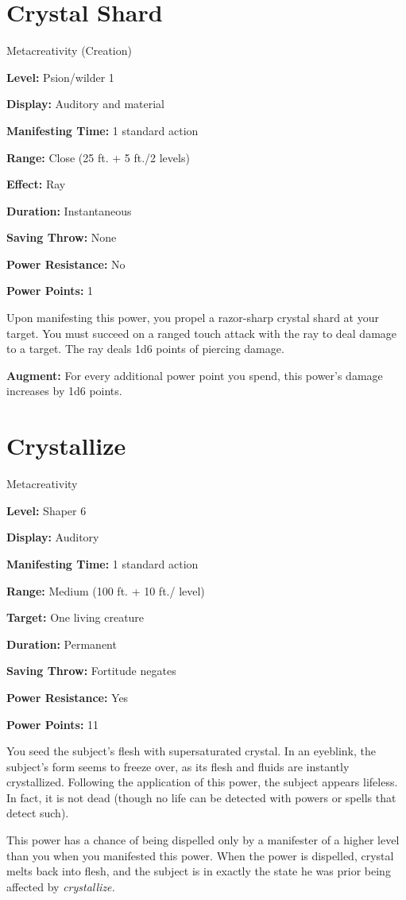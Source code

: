 \documentclass{article}
\begin{document}
\vspace{12pt}
\section*{Crystal Shard}

Metacreativity (Creation)

\textbf{Level:} Psion/wilder 1

\textbf{Display:} Auditory and material

\textbf{Manifesting Time:} 1 standard action

\textbf{Range:} Close (25 ft. + 5 ft./2 levels)

\textbf{Effect:} Ray

\textbf{Duration:} Instantaneous

\textbf{Saving Throw:} None

\textbf{Power Resistance:} No

\textbf{Power Points:} 1

Upon manifesting this power, you propel a razor-sharp crystal shard at your target. 
You must succeed on a ranged touch attack with the ray to deal damage to a target. 
The ray deals 1d6 points of piercing damage.

\textbf{Augment:} For every additional power point you spend, this power's damage 
increases by 1d6 points.

\vspace{12pt}
\section*{Crystallize}

Metacreativity

\textbf{Level:} Shaper 6

\textbf{Display:} Auditory

\textbf{Manifesting Time:} 1 standard action

\textbf{Range:} Medium (100 ft. + 10 ft./ level)

\textbf{Target:} One living creature

\textbf{Duration:} Permanent

\textbf{Saving Throw:} Fortitude negates

\textbf{Power Resistance:} Yes

\textbf{Power Points:} 11

You seed the subject's flesh with supersaturated crystal. In an eyeblink, the subject's 
form seems to freeze over, as its flesh and fluids are instantly crystallized. 
Following the application of this power, the subject appears lifeless. In fact, 
it is not dead (though no life can be detected with powers or spells that detect 
such).

This power has a chance of being dispelled only by a manifester of a higher level 
than you when you manifested this power. When the power is dispelled, crystal melts 
back into flesh, and the subject is in exactly the state he was prior being affected 
by \textit{crystallize.}

\newpage
\end{document}
